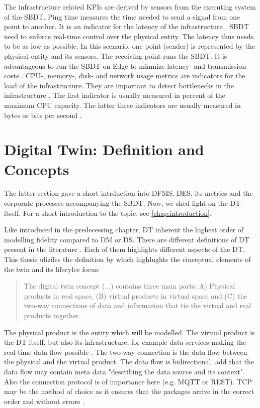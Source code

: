 The infrastructure related KPIs are derived by sensors from the executing system of the SBDT. Ping time measures the time needed to send a signal from one point to another. It is an indicator for the latency of the infrastructure \parencite{wu2021digital}. SBDT need to enforce real-time control over the physical entity. The latency thus needs to be as low as possible. In this scenario, one point (sender) is represented by the physical entity and its sensors. The receiving point runs the SBDT. It is advantageous to run the SBDT on Edge to minmize latency- and transmission costs \parencite{li2018learning}. CPU-, memory-, disk- and network usage metrics are indicators for the load of the infrastructure. They are important to detect bottlenecks in the infrastructure \parencite{li2018learning}. The first indicator is usually measured in percent of the maximum CPU capacity. The latter three indicators are usually measured in bytes or bits per second \parencite{granelli2021evaluating}.


\section{Digital Twin: Definition and Concepts}
\label{sec:digital-twin}
The latter section gave a short intrduction into DFMS, DES, its metrics and the corporate processes accompanying the SBDT. Now, we shed light on the DT itself. For a short introduction to the topic, see \autoref{chap:introduction}.

Like introduced in the predecessing chapter, DT inherent the highest order of modelling fidelity compared to DM or DS. There are different definitions of DT present in the literature \parencite{Negri2017promfg,zheng2019application,glaessgen2012digital,Demkovich2018def,boschert2016digital,grieves2014digital,kritzinger2018digital,Tao2018ijamt,zehnder2018representing}. Each of them highlights different aspects of the DT. This thesis uliziles the definition by \autocite{grieves2014digital} which highlughts the cinceptual elements of the twin and its lifecylce focus:

\begin{quote}
  The digital twin concept (...) contains three main parts: A) Physical products in real space, (B) virtual products in virtual space and (C) the two-way connections of data and information that tie the virtual and real products together. \autocite{grieves2014digital}
\end{quote}

The physical product is the entity which will be modelled. The virtual product is the DT itself, but also its infrastructure, for example data services making the real-time data flow possible \parencite{Tao2018ijamt}. The two-way connection is the data flow between the physical and the virtual product. The data flow is bidirectional. \citeauthor{zehnder2018representing} add that the data flow may contain meta data "describing the data source and its context". Also the connection protocol is of importance here (e.g. MQTT or REST). TCP may be the method of choice as it ensures that the packages arrive in the correct order and without errors \parencite{li2018learning}.

